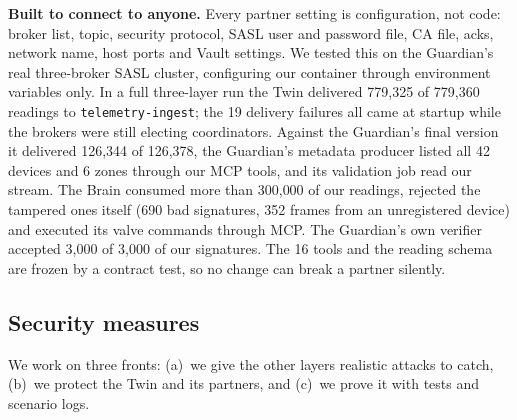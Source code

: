 \documentclass[10pt,a4paper]{article}
\begin{document}
\textbf{Built to connect to anyone.} Every partner setting is configuration, not code: broker list, topic, security protocol, SASL user and password file, CA file, acks, network name, host ports and Vault settings. We tested this on the Guardian's real three-broker SASL cluster, configuring our container through environment variables only. In a full three-layer run the Twin delivered 779{,}325 of 779{,}360 readings to \texttt{telemetry-ingest}; the 19 delivery failures all came at startup while the brokers were still electing coordinators. Against the Guardian's final version it delivered 126{,}344 of 126{,}378, the Guardian's metadata producer listed all 42 devices and 6 zones through our MCP tools, and its validation job read our stream. The Brain consumed more than 300{,}000 of our readings, rejected the tampered ones itself (690 bad signatures, 352 frames from an unregistered device) and executed its valve commands through MCP. The Guardian's own verifier accepted 3{,}000 of 3{,}000 of our signatures. The 16 tools and the reading schema are frozen by a contract test, so no change can break a partner silently.

\subsection{Security measures}
We work on three fronts: (a)~we give the other layers realistic attacks to catch, (b)~we protect the Twin and its partners, and (c)~we prove it with tests and scenario logs.
\end{document}

